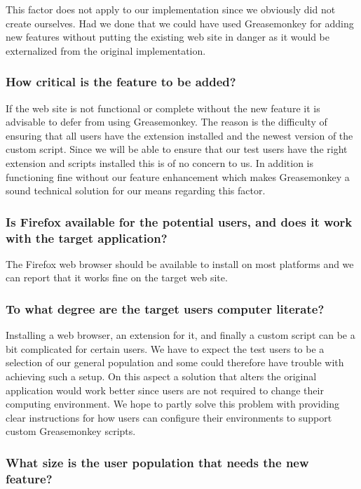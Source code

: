 This factor does not apply to our implementation since we obviously did not
create \urort{} ourselves. Had we done that we could have used
Greasemonkey for adding new features without putting the existing web
site in danger as it would be externalized from the original implementation.

\subsubsection{How critical is the feature to be added?}

If the web site is not functional or complete without the new feature
it is advisable to defer from using Greasemonkey. The reason is the
difficulty of ensuring that all users have the extension installed
and the newest version of the custom script. Since we will be able
to ensure that our test users have the right extension and scripts
installed this is of no concern to us. In addition \urort{} is
functioning fine without our feature enhancement which makes
Greasemonkey a sound technical solution for our means regarding this factor.


\subsubsection{Is Firefox available for the potential users, and does it
  work with the target application?}

The Firefox web browser should be available to install on most platforms
and we can report that it works fine on the target web site.

\subsubsection{To what degree are the target users computer literate?}

Installing a web browser, an extension for it, and finally a custom script
can be a bit complicated for certain users. We have to expect the
test users to be a selection of our general population and some could
therefore have trouble with achieving such a setup. On this aspect
a solution that alters the original application would work better
since users are not required to change their computing environment.
We hope to partly solve this problem with providing clear instructions
for how users can configure their environments to support custom
Greasemonkey scripts.

\subsubsection{What size is the user population that needs the new feature?}

